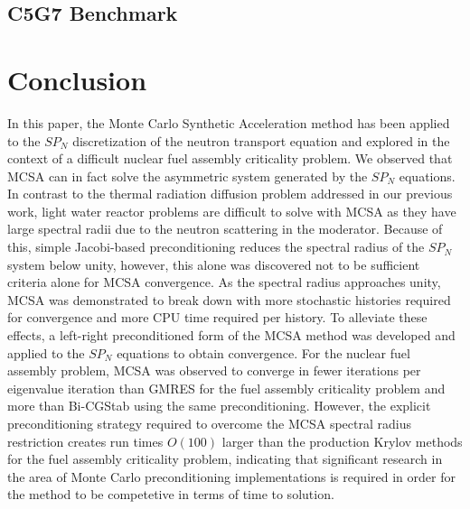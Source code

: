 \documentclass[letterpaper,11pt]{article}
\begin{document}
\subsection{C5G7 Benchmark}

\section{Conclusion}
\label{sec:conclusion}

In this paper, the Monte Carlo Synthetic Acceleration method has been
applied to the $SP_N$ discretization of the neutron transport equation
and explored in the context of a difficult nuclear fuel assembly
criticality problem. We observed that MCSA can in fact solve the
asymmetric system generated by the $SP_N$ equations. In contrast to
the thermal radiation diffusion problem addressed in our previous
work, light water reactor problems are difficult to solve with MCSA as
they have large spectral radii due to the neutron scattering in the
moderator. Because of this, simple Jacobi-based preconditioning
reduces the spectral radius of the $SP_N$ system below unity, however,
this alone was discovered not to be sufficient criteria alone for MCSA
convergence. As the spectral radius approaches unity, MCSA was
demonstrated to break down with more stochastic histories required for
convergence and more CPU time required per history. To alleviate these
effects, a left-right preconditioned form of the MCSA method was
developed and applied to the $SP_N$ equations to obtain
convergence. For the nuclear fuel assembly problem, MCSA was observed
to converge in fewer iterations per eigenvalue iteration than GMRES
for the fuel assembly criticality problem and more than Bi-CGStab
using the same preconditioning. However, the explicit preconditioning
strategy required to overcome the MCSA spectral radius restriction
creates run times $O(100)$ larger than the production Krylov methods
for the fuel assembly criticality problem, indicating that significant
research in the area of Monte Carlo preconditioning implementations is
required in order for the method to be competetive in terms of time to
solution.

\pagebreak
 

\end{document}
